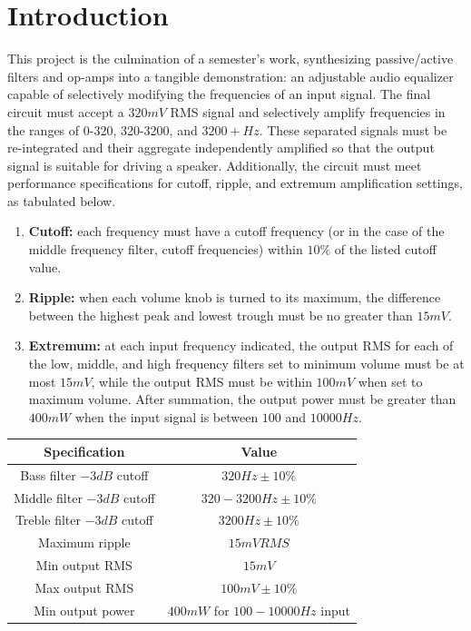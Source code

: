 \documentclass[notitlepage, 12pt]{report}
\begin{document}
\section*{Introduction}
This project is the culmination of a semester's work, synthesizing 
passive/active filters and op-amps into a tangible demonstration: an adjustable 
audio equalizer capable of selectively modifying the frequencies 
of an input signal. The final circuit must accept a $320 mV$ RMS signal and selectively amplify 
frequencies in the ranges of 0-320, 320-3200, and $3200+ Hz$. These separated
signals must be re-integrated and their aggregate independently amplified so that 
the output signal is suitable for driving a speaker. 
Additionally, the circuit must meet performance specifications for cutoff, 
ripple, and extremum amplification settings, as tabulated below. 
\begin{enumerate}
    \item \textbf{Cutoff:} each frequency must have a cutoff frequency
    (or in the case of the middle frequency filter, cutoff frequencies)
    within $10\%$ of the listed cutoff value. 
    \item \textbf{Ripple:} when each volume knob is turned to its maximum, 
    the difference between the highest peak and lowest trough 
    must be no greater than $15mV$. 
    \item \textbf{Extremum:} at each input frequency 
    indicated, the output RMS for each of the low, middle, and high 
    frequency filters set to minimum volume must be at most $15 mV$, 
    while the output RMS must be within $100 mV$ when set to maximum volume. 
    After summation, the output power must be greater than $400 mW$ when the 
    input signal is between $100$ and $10000 Hz$. 
\end{enumerate}
\begin{center}
    \begin{tabular}{c c} 
        \toprule
        Specification & Value \\
        \hline  
        Bass filter $-3dB$ cutoff & $320 Hz \pm 10\%$ \\
        Middle filter $-3dB$ cutoff & $320-3200 Hz \pm 10\%$ \\
        Treble filter $-3dB$ cutoff & $3200 Hz \pm 10\%$ \\
        \hline
        Maximum ripple & $15 mV RMS$ \\
        \hline
        Min output RMS & $15 mV$ \\
        Max output RMS & $100 mV \pm 10\%$ \\
        Min output power & $400 mW$ for $100-10000 Hz$ input \\
        \bottomrule  
    \end{tabular}
\end{center}
\end{document}
